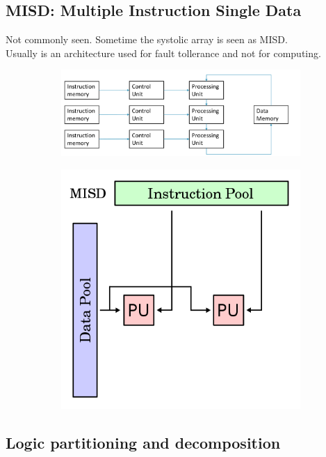 \subsection{MISD: Multiple Instruction Single Data}
Not commonly seen. Sometime the systolic array is seen as MISD.\\
Usually is an architecture used for fault tollerance and not for computing.


\begin{figure}[ht]
\centering
\begin{subfigure}{.7\textwidth}
  \centering
  \includegraphics[width=.9\textwidth]{figure_parallel/misd.png}
\end{subfigure}%
\begin{subfigure}{.3\textwidth}
  \centering
  \includegraphics[width=.9\textwidth]{figure_parallel/misd2.png}
\end{subfigure}
\end{figure}

\subsection{Logic partitioning and decomposition}

